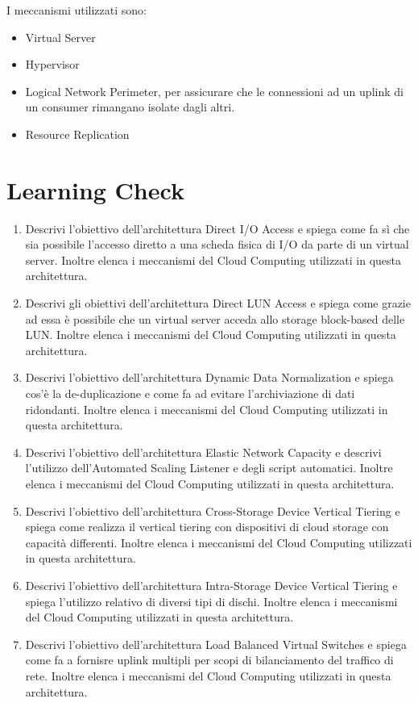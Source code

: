 I meccanismi utilizzati sono:
\begin{itemize}
    \item Virtual Server
    \item Hypervisor
    \item Logical Network Perimeter, per assicurare che le connessioni ad un uplink di un consumer rimangano isolate dagli altri.
    \item Resource Replication
\end{itemize}

\section{Learning Check}
\begin{enumerate}
    \item Descrivi l'obiettivo dell'architettura Direct I/O Access e spiega come fa sì che sia possibile l'accesso diretto a una scheda fisica di I/O da parte di un virtual server. Inoltre elenca i meccanismi del Cloud Computing utilizzati in questa architettura.
    \item Descrivi gli obiettivi dell'architettura Direct LUN Access e spiega come grazie ad essa è possibile che un virtual server acceda allo storage block-based delle LUN. Inoltre elenca i meccanismi del Cloud Computing utilizzati in questa architettura.
    \item Descrivi l'obiettivo dell'architettura Dynamic Data Normalization e spiega cos'è la de-duplicazione e come fa ad evitare l'archiviazione di dati ridondanti. Inoltre elenca i meccanismi del Cloud Computing utilizzati in questa architettura.
    \item Descrivi l'obiettivo dell'architettura Elastic Network Capacity e descrivi l'utilizzo dell'Automated Scaling Listener e degli script automatici. Inoltre elenca i meccanismi del Cloud Computing utilizzati in questa architettura.
    \item Descrivi l'obiettivo dell'architettura Cross-Storage Device Vertical Tiering e spiega come realizza il vertical tiering con dispositivi di cloud storage con capacità differenti. Inoltre elenca i meccanismi del Cloud Computing utilizzati in questa architettura.
    \item Descrivi l'obiettivo dell'architettura Intra-Storage Device Vertical Tiering e spiega l'utilizzo relativo di diversi tipi di dischi. Inoltre elenca i meccanismi del Cloud Computing utilizzati in questa architettura.
    \item Descrivi l'obiettivo dell'architettura Load Balanced Virtual Switches e spiega come fa a fornisre uplink multipli per scopi di bilanciamento del traffico di rete. Inoltre elenca i meccanismi del Cloud Computing utilizzati in questa architettura.

\end{enumerate}
